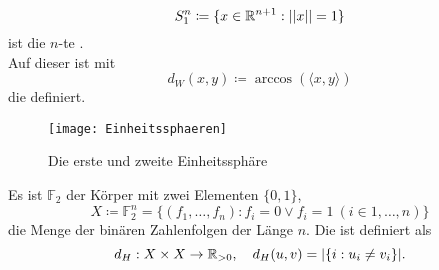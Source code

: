 \begin{example}[Einheitssphäre]\label{bsp:einheitssphaere}
  \begin{equation*}
    S_1^n \coloneqq \{ x \in \mathbb{R}^{n+1} : ||x|| = 1 \}
  \end{equation*}
  ist die \( n \)-te . \\
  Auf dieser ist mit
  \begin{equation*}
     d_W(x, y) \coloneqq \arccos(\langle x, y \rangle)
  \end{equation*}
  die  definiert.

  \begin{figure}[H]
    \texttt{[image: Einheitssphaeren]}
    \caption{Die erste und zweite Einheitssphäre}
  \end{figure}
\end{example}

\begin{example}
  Es ist \( \mathbb{F}_2 \) der Körper mit zwei Elementen \( \{ 0, 1 \} \),
  \begin{equation*}
    X \coloneqq \mathbb{F}_2^n = \{ (f_1, \dots, f_n) : f_i = 0 \vee f_i = 1 \ (i \in {1, \dots, n}) \}
  \end{equation*}
  die Menge der binären Zahlenfolgen der Länge \( n \). Die  ist definiert als
  \begin{equation*}
    d_H: X \times X \to \mathbb{R}_{>0}, \quad d_H(u,v) = |\{ i : u_i \neq v_i \}|\text{.}
  \end{equation*}
\end{example}